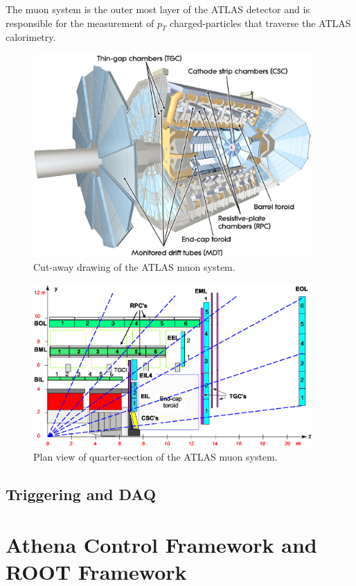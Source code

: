 The muon system is the outer most layer of the ATLAS detector and is responsible for the measurement of $p_{T}$ charged-particles that traverse the ATLAS calorimetry. 

\begin{figure}[htbp]
  \centering  
  \includegraphics[width=0.95\textwidth]{PartDetector/Diagrams/ATLAS_MuonSystem.eps}
  \caption{Cut-away drawing of the ATLAS muon system.}
  \label{fig:DetectorDrawingMuonSystem}
\end{figure}

\begin{figure}[htbp]
  \centering
  \includegraphics[width=0.95\textwidth]{PartDetector/Diagrams/Muon_section.eps}
  \caption{Plan view of quarter-section of the ATLAS muon system.}
  \label{fig:DetectorMuonOverview}
\end{figure}
\subsection{Triggering and DAQ}

\section{Athena Control Framework and ROOT Framework}
